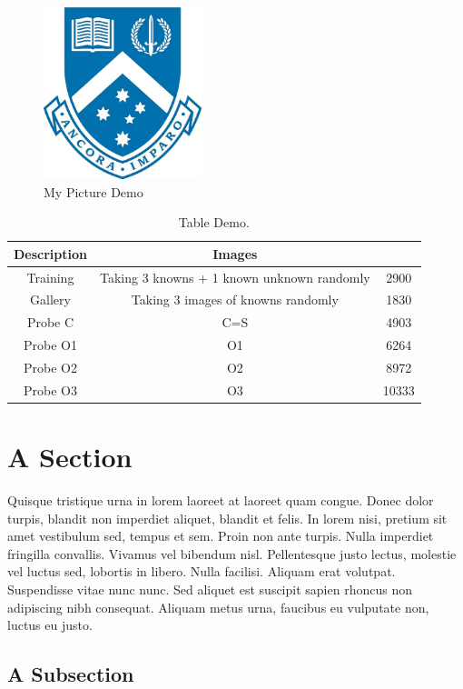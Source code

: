 \begin{figure}
\centering
  \includegraphics[height=5cm]{Figures/crest.jpg}%
  \caption{My Picture Demo\label{fig.demo1}}
\end{figure}

\begin{table}[]
\caption{Table Demo.\label{table.demo1}}
\centering
\begin{tabular}{|c|c|c|}
\hline
Description & Images &  \\ \hline
Training & Taking 3 knowns + 1 known unknown randomly & 2900 \\ \hline
Gallery & Taking 3 images of knowns randomly & 1830 \\ \hline
Probe C & C=S & 4903 \\ \hline
Probe O1 & O1 & 6264 \\ \hline
Probe O2 & O2 & 8972 \\ \hline
Probe O3 & O3 & 10333 \\ \hline
\end{tabular}
\end{table}

\section{A Section}

Quisque tristique urna in lorem laoreet at laoreet quam congue. Donec dolor turpis, blandit non imperdiet aliquet, blandit et felis. In lorem nisi, pretium sit amet vestibulum sed, tempus et sem. Proin non ante turpis. Nulla imperdiet fringilla convallis. Vivamus vel bibendum nisl. Pellentesque justo lectus, molestie vel luctus sed, lobortis in libero. Nulla facilisi. Aliquam erat volutpat. Suspendisse vitae nunc nunc. Sed aliquet est suscipit sapien rhoncus non adipiscing nibh consequat. Aliquam metus urna, faucibus eu vulputate non, luctus eu justo.

\subsection{A Subsection}

